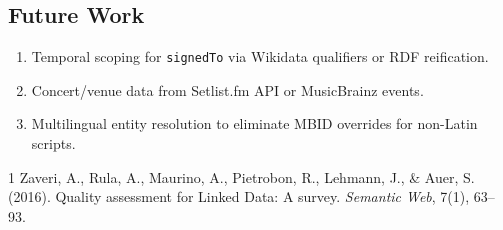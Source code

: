 \documentclass[11pt,a4paper]{article}
\begin{document}
\subsection{Future Work}
\begin{enumerate}[nosep]
  \item Temporal scoping for \texttt{signedTo} via Wikidata qualifiers or RDF reification.
  \item Concert/venue data from Setlist.fm API or MusicBrainz events.
  \item Multilingual entity resolution to eliminate MBID overrides for non-Latin scripts.
\end{enumerate}

\begin{thebibliography}{1}
 Zaveri, A., Rula, A., Maurino, A., Pietrobon, R., Lehmann, J., \& Auer, S. (2016). Quality assessment for Linked Data: A survey. \textit{Semantic Web}, 7(1), 63--93.
\end{thebibliography}
\end{document}
